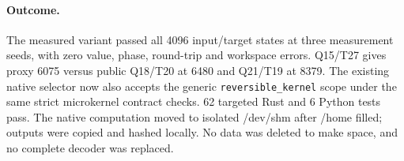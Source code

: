 \documentclass{article}
\begin{document}
\paragraph{Outcome.} The measured variant passed all 4096 input/target states
at three measurement seeds, with zero value, phase, round-trip and workspace
errors. Q15/T27 gives proxy 6075 versus public Q18/T20 at 6480 and Q21/T19
at 8379. The existing native selector now also accepts the generic
\texttt{reversible\_kernel} scope under the same strict microkernel contract
checks. 62 targeted Rust and 6 Python tests pass. The native computation moved
to isolated /dev/shm after /home filled; outputs were copied and hashed locally.
No data was deleted to make space, and no complete decoder was replaced.
\begin{center}\end{center}
\end{document}
